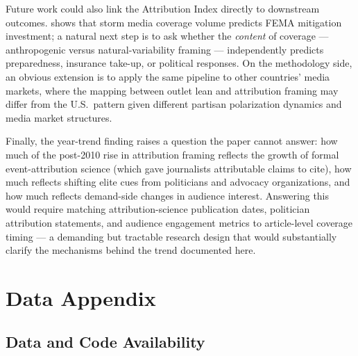 \documentclass[12pt]{article}
\begin{document}
Future work could also link the Attribution Index directly to
downstream outcomes.  \citet{magontier2020} shows that storm media
coverage volume predicts FEMA mitigation investment; a natural next
step is to ask whether the \emph{content} of coverage --- anthropogenic
versus natural-variability framing --- independently predicts
preparedness, insurance take-up, or political responses.  On the
methodology side, an obvious extension is to apply the same pipeline
to other countries' media markets, where the mapping between outlet
lean and attribution framing may differ from the U.S.\ pattern given
different partisan polarization dynamics and media market structures.

Finally, the year-trend finding raises a question the paper cannot
answer: how much of the post-2010 rise in attribution framing reflects
the growth of formal event-attribution science (which gave journalists
attributable claims to cite), how much reflects shifting elite cues
from politicians and advocacy organizations, and how much reflects
demand-side changes in audience interest.  Answering this would require
matching attribution-science publication dates, politician attribution
statements, and audience engagement metrics to article-level coverage
timing --- a demanding but tractable research design that would
substantially clarify the mechanisms behind the trend documented here.


\newpage




\appendix
\section{Data Appendix}

\subsection{Data and Code Availability}
\label{sec:data_availability}
\end{document}
